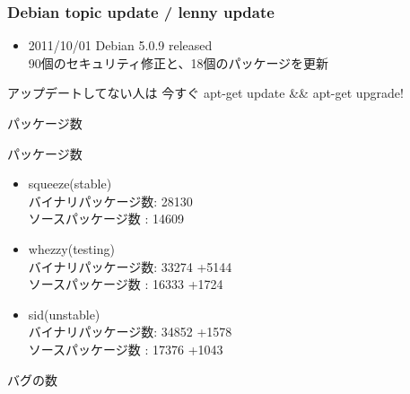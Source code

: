 \begin{frame}
 \frametitle{Debian topic update / lenny update}
\begin{itemize}

\item 2011/10/01 Debian 5.0.9 released\\
90個のセキュリティ修正と、18個のパッケージを更新

\end{itemize}
\end{frame}

\begin{frame}
\begin{center}
\LARGE{アップデートしてない人は 今すぐ apt-get update \&\& apt-get upgrade!}
\end{center}
\end{frame}

\begin{frame}
\begin{center}
\LARGE{パッケージ数}
\end{center}
\end{frame}

\begin{frame}{パッケージ数}
\begin{itemize}[<+->]


\item squeeze(stable)\\
バイナリパッケージ数: 28130\\
ソースパッケージ数  : 14609

\item whezzy(testing)\\ 
バイナリパッケージ数: 33274 {\color{red}+5144}\\
ソースパッケージ数  : 16333 {\color{red}+1724}

\item sid(unstable)\\ 
バイナリパッケージ数: 34852 {\color{red}+1578}\\
ソースパッケージ数  : 17376 {\color{red}+1043}
\end{itemize}

\end{frame}

\begin{frame}
\begin{center}
\LARGE{バグの数}
\end{center}
\end{frame}


